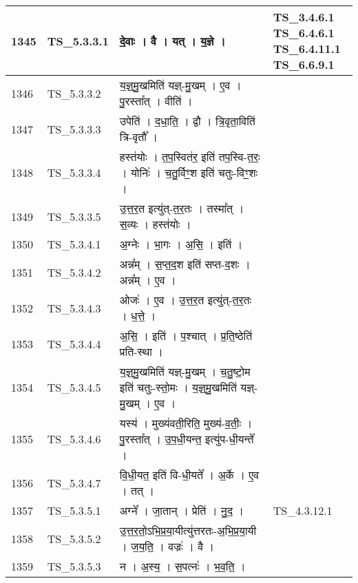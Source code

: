 \documentclass[17pt]{extarticle}
\begin{document}
\begin{longtable}{||p{0.4in}||p{0.9in}||p{4.0in}||p{0.9in}||}
        \hline
            1345 & TS\_5.3.3.1 & दे॒वाः   ।   वै   ।   यत्   ।   य॒ज्ञे   ।    & TS\_3.4.6.1  TS\_6.4.6.1 TS\_6.4.11.1 TS\_6.6.9.1       \\
        \hline
            1346 & TS\_5.3.3.2 & य॒ज्ञ्॒मु॒खमिति॑ यज्ञ्{-}मु॒खम्   ।   ए॒व   ।   पु॒रस्ता᳚त्   ।   वीति॑   ।    &      \\
        \hline
            1347 & TS\_5.3.3.3 & उपेति॑   ।   द॒धा॒ति॒   ।   द्वौ   ।   त्रि॒वृता॒विति॑ त्रि{-}वृतौ᳚   ।    &      \\
        \hline
            1348 & TS\_5.3.3.4 & हस्त॑योः   ।   त॒प॒स्वित॑र॒ इति॑ तप॒स्वि{-}त॒रः॒   ।   योनिः॑   ।   च॒तु॒र्विꣳ॒॒श इति॑ चतुः{-}विꣳ॒॒शः   ।    &      \\
        \hline
            1349 & TS\_5.3.3.5 & उ॒त्त॒र॒त इत्यु॑त्{-}त॒र॒तः   ।   तस्मा᳚त्   ।   स॒व्यः   ।   हस्त॑योः   ।    &      \\
        \hline
            1350 & TS\_5.3.4.1 & अ॒ग्नेः   ।   भा॒गः   ।   अ॒सि॒   ।   इति॑   ।    &      \\
        \hline
            1351 & TS\_5.3.4.2 & अन्न᳚म्   ।   स॒प्त॒द॒श इति॑ सप्त{-}द॒शः   ।   अन्न᳚म्   ।   ए॒व   ।    &      \\
        \hline
            1352 & TS\_5.3.4.3 & ओजः॑   ।   ए॒व   ।   उ॒त्त॒र॒त इत्यु॑त्{-}त॒र॒तः   ।   ध॒त्ते॒   ।    &      \\
        \hline
            1353 & TS\_5.3.4.4 & अ॒सि॒   ।   इति॑   ।   प॒श्चात्   ।   प्र॒ति॒ष्ठेति॑ प्रति{-}स्था   ।    &      \\
        \hline
            1354 & TS\_5.3.4.5 & य॒ज्ञ्॒मु॒खमिति॑ यज्ञ्{-}मु॒खम्   ।   च॒तु॒ष्टो॒म इति॑ चतुः{-}स्तो॒मः   ।   य॒ज्ञ्॒मु॒खमिति॑ यज्ञ्{-}मु॒खम्   ।   ए॒व   ।    &      \\
        \hline
            1355 & TS\_5.3.4.6 & यस्य॑   ।   मुख्य॑वती॒रिति॒ मुख्य॑{-}व॒तीः॒   ।   पु॒रस्ता᳚त्   ।   उ॒प॒धी॒यन्त॒ इत्यु॑प{-}धी॒यन्ते᳚   ।    &      \\
        \hline
            1356 & TS\_5.3.4.7 & वि॒धी॒यत॒ इति॑ वि{-}धी॒यते᳚   ।   अ॒र्के   ।   ए॒व   ।   तत्   ।    &      \\
        \hline
            1357 & TS\_5.3.5.1 & अग्ने᳚   ।   जा॒तान्   ।   प्रेति॑   ।   नु॒द॒   ।    & TS\_4.3.12.1        \\
        \hline
            1358 & TS\_5.3.5.2 & उ॒त्त॒र॒तो॒ऽभि॒प्र॒या॒यीत्यु॑त्तरतः{-}अ॒भि॒प्र॒या॒यी   ।   ज॒य॒ति॒   ।   वज्रः॑   ।   वै   ।    &      \\
        \hline
            1359 & TS\_5.3.5.3 & न   ।   अ॒स्य॒   ।   स॒पत्नः॑   ।   भ॒व॒ति॒   ।    &      \\

\end{longtable}
\end{document}
